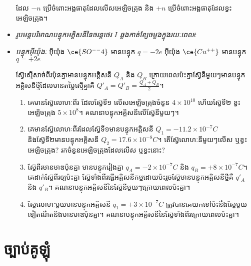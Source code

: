 \begin{itemize}
	ដែល $-n$ ប្រើចំពោះអង្គធាតុដែលលើសអេឡិចត្រុង និង $+n$ ប្រើចំពោះអង្គធាតុដែលខ្វះអេឡិចត្រុង។
	\item \emph{\kml រូបមន្តបរិមាណបន្ទុកអគ្គិសនីនៃចរន្តថេរ $I$ ឆ្លងកាត់ខ្សែចម្លងក្នុងរយៈពេល$t$} 
	\item \emph{\kml បន្ទុកអុីយ៉ុងៈ} អុីយ៉ុង $\ce{SO^{--}4}$ មានបន្ទុក $q=-2e$ អុីយ៉ុង $\ce{Cu^{++}}$ មានបន្ទុក $q=+2e$
	\begin{remark}
		ស៊្វែស្មើសាច់ពីរប៉ុនគ្នាមានបន្ទុកអគ្គិសនី $Q_{A}$ និង $Q_{B}$ ក្រោយពេលប៉ះគ្នាស៊្វែនីមួយៗមានបន្ទុកអគ្គិសនីថ្មីដែលមានតម្លៃស្មើគ្នាគឺ $Q'_{A}=Q'_{B}=\frac{Q_{A}+Q_{B}}{2}$។
	\end{remark}
	\begin{practice}
		\begin{enumerate}[m]
			\item គេមានស៊្វែលោហៈពីរ ដែលស៊្វែទី១ លើសអេឡិចត្រុងចំនួន $4\times10^{10}$ ហើយស៊្វែទី២ ខ្វះអេឡិចត្រុង $5\times10^{8}$។ គណនាបន្ទុកអគ្គិសនីលើស៊្វែនីមួយៗ។
			\item គេមានស៊្វែលោហៈពីរដែលស៊្វែទី១មានបន្ទុកអគ្គិសនី $Q_{1}=-11.2\times10^{-7}C$ និងស៊្វែទី២មានបន្ទុកអគ្គិសនី $Q_{2}=17.6\times10^{-8}C$។ តើស៊្វែលោហៈនីមួយៗលើស ឬខ្វះអេឡិចត្រុង? រកចំនួនអេឡិចត្រុងដែលលើស ឬខ្វះនោះ?
			\item ស៊្វែពីរមានមាឌប៉ុនគ្នា មានបន្ទុករៀងគ្នា $q_{A}=-2\times10^{-7}C$ និង $q_{B}=+8\times10^{-7}C$។ គេដាក់ស៊្វែពីរឲ្យប៉ះគ្នា ស៊្វែទាំងពីរធ្វើអគ្គិសនីកម្មដោយប៉ះរួចស៊្វែមានបន្ទុកអគ្គិសនីថ្មីគឺ $q'_{A}$ និង $q'_{B}$។ គណនាបន្ទុកអគ្គិសនីនៃស៊្វែនីមួយៗក្រោយពេលប៉ះគ្នា។
			\item ស៊្វែលោហៈមួយមានបន្ទុកអគ្គិសនី $q_{1}=+3\times10^{-7}C$ ត្រូវបានគេយកទៅប៉ះនឹងស៊្វែមួយទៀតណឺតនិងមានមាឌប៉ុនគ្នា។ គណនាបន្ទុកអគ្គិសនីនៃស៊្វែទាំងពីរក្រោយពេលប៉ះគ្នា។
		\end{enumerate}
	\end{practice}
\end{itemize}
\section{ច្បាប់គូឡុំ}
